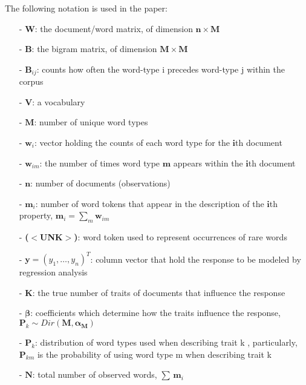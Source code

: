 \documentclass[11pt]{report}
\begin{document}
The following notation is used in the paper: 
\begin{itemize}
\item [-] $\mathbf{W}$: the document/word matrix, of dimension $\mathbf{n} \times \mathbf{M}$
\item [-] $\mathbf{B}$: the bigram matrix, of dimension $\mathbf{M} \times \mathbf{M}$
\item [-] $\mathbf{B}_{ij}$: counts how often the word-type i precedes word-type j within the corpus
\item [-] $\mathbf{V}$: a vocabulary
\item [-] $\mathbf{M}$: number of unique word types
\item [-] $\mathbf{w}_i$: vector holding the counts of each word type for the $\mathbf{i}$th document
\item [-] $\mathbf{w}_{im}$: the number of times word type $\mathbf{m}$ appears within  the $\mathbf{i}$th document
\item [-] $\mathbf{n}$: number of documents (observations)
\item [-] $\mathbf{m}_i$: number of word tokens that appear in the description of the $\mathbf{i}$th property, $\mathbf{m}_i = \sum_{m}\mathbf{w}_{im} $
\item [-] {\bf ($<$UNK$>$)}: word token used to represent occurrences of rare words
\item [-] $\mathbf{y} = (y_1,\dots,y_n)^{T} $: column vector that hold the response to be modeled by regression analysis
\item [-] $\mathbf{K}$: the true number of traits of documents that influence the response
\item [-] {\bf $\mathbf{\beta}$}: coefficients which determine how the traits influence the response, $\mathbf{P}_k \sim Dir(\mathbf{M, \alpha_M})$
\item [-] $\mathbf{P}_k$: distribution of word types used when describing trait k , particularly, $\mathbf{P}_{km}$ is the probability of using word type m when describing trait k
\item [-] $\mathbf{N}$: total number of observed words, $\sum\,\mathbf{m}_i$


\end{itemize}
\end{document}
